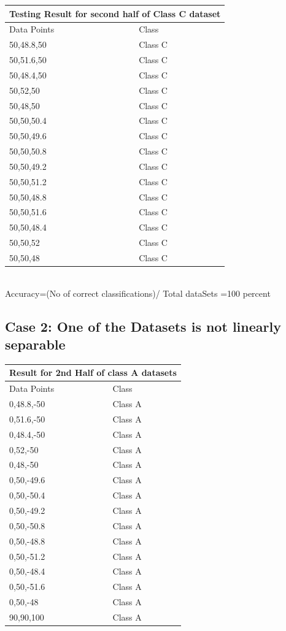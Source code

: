 \documentclass[letterpaper]{article}
\begin{document}
\begin{tabular}{ |p{5cm}||p{5cm}| }
 \hline
 \multicolumn{2}{|c|}{Testing Result for second half of Class C dataset} \\
 \hline
Data Points& Class\\
 \hline
50,48.8,50 & Class C \\
50,51.6,50 & Class C \\
50,48.4,50 & Class C \\
50,52,50 & Class C \\
50,48,50 & Class C \\
50,50,50.4 & Class C \\
50,50,49.6 & Class C \\
50,50,50.8 & Class C \\
50,50,49.2 & Class C \\
50,50,51.2 & Class C \\
50,50,48.8 & Class C \\
50,50,51.6 & Class C \\
50,50,48.4 & Class C \\
50,50,52 & Class C \\
50,50,48 & Class C \\
 \hline

\end {tabular} \\

Accuracy=(No of correct classifications)/ Total dataSets =100 percent 


  \subsection {Case 2: One of the Datasets is not linearly separable}

  \begin{tabular}{ |p{5cm}||p{5cm}| }
 \hline
 \multicolumn{2}{|c|}{Result for 2nd Half of class A datasets} \\
 \hline
Data Points& Class\\
 \hline
0,48.8,-50 & Class A \\
0,51.6,-50 & Class A \\
0,48.4,-50 &  Class A \\
0,52,-50 &  Class A  \\
0,48,-50 &  Class A \\
0,50,-49.6 &  Class A \\
0,50,-50.4 &   Class A \\
0,50,-49.2 &  Class A \\
0,50,-50.8 &  Class A \\
0,50,-48.8 &  Class A \\
0,50,-51.2 &  Class A \\
0,50,-48.4 &  Class A \\
0,50,-51.6 &  Class A \\
0,50,-48 &  Class A \\
90,90,100 &  Class A \\
 
 \hline


\end{tabular}
\end{document}
